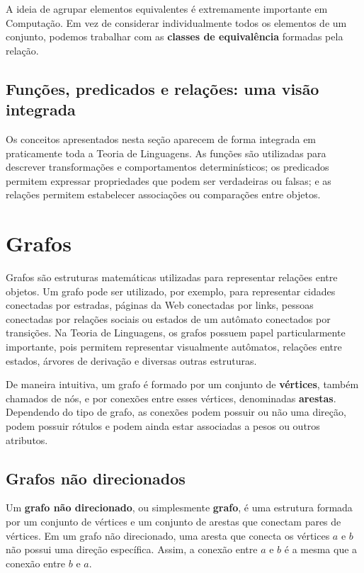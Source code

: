 \documentclass[
  brazilian,
  letterpaper,
]{book}
\theoremstyle{plain}
\theoremstyle{definition}
\theoremstyle{remark}
\begin{document}
A ideia de agrupar elementos equivalentes é extremamente importante em
Computação. Em vez de considerar individualmente todos os elementos de
um conjunto, podemos trabalhar com as \textbf{classes de equivalência}
formadas pela relação.

\subsection{Funções, predicados e relações: uma visão
integrada}\label{funuxe7uxf5es-predicados-e-relauxe7uxf5es-uma-visuxe3o-integrada}

Os conceitos apresentados nesta seção aparecem de forma integrada em
praticamente toda a Teoria de Linguagens. As funções são utilizadas para
descrever transformações e comportamentos determinísticos; os predicados
permitem expressar propriedades que podem ser verdadeiras ou falsas; e
as relações permitem estabelecer associações ou comparações entre
objetos.

\section{Grafos}\label{grafos}

Grafos são estruturas matemáticas utilizadas para representar relações
entre objetos. Um grafo pode ser utilizado, por exemplo, para
representar cidades conectadas por estradas, páginas da Web conectadas
por links, pessoas conectadas por relações sociais ou estados de um
autômato conectados por transições. Na Teoria de Linguagens, os grafos
possuem papel particularmente importante, pois permitem representar
visualmente autômatos, relações entre estados, árvores de derivação e
diversas outras estruturas.

De maneira intuitiva, um grafo é formado por um conjunto de
\textbf{vértices}, também chamados de nós, e por conexões entre esses
vértices, denominadas \textbf{arestas}. Dependendo do tipo de grafo, as
conexões podem possuir ou não uma direção, podem possuir rótulos e podem
ainda estar associadas a pesos ou outros atributos.

\subsection{Grafos não direcionados}\label{grafos-nuxe3o-direcionados}

Um \textbf{grafo não direcionado}, ou simplesmente \textbf{grafo}, é uma
estrutura formada por um conjunto de vértices e um conjunto de arestas
que conectam pares de vértices. Em um grafo não direcionado, uma aresta
que conecta os vértices \(a\) e \(b\) não possui uma direção específica.
Assim, a conexão entre \(a\) e \(b\) é a mesma que a conexão entre \(b\)
e \(a\).
\end{document}
